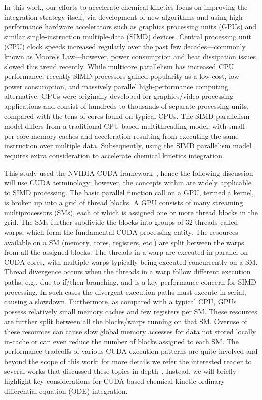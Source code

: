 \documentclass[preprint,review,11pt]{elsarticle}
\begin{document}
In this work, our efforts to accelerate chemical kinetics focus on improving the integration strategy itself, via development of new algorithms and using high-performance hardware accelerators such as graphics processing units (GPUs) and similar single-instruction multiple-data (SIMD) devices.
Central processing unit (CPU) clock speeds increased regularly over the past few decades---commonly known as Moore's Law---however, power consumption and heat dissipation issues slowed this trend recently.
While multicore parallelism has increased CPU performance, recently SIMD processors gained popularity as a low cost, low power consumption, and massively parallel high-performance computing alternative.
GPUs were originally developed for graphics\slash video processing applications and consist of hundreds to thousands of separate processing units, compared with the tens of cores found on typical CPUs.
The SIMD parallelism model differs from a traditional CPU-based multithreading model, with small per-core memory caches and acceleration resulting from executing the same instruction over multiple data.
Subsequently, using the SIMD parallelism model requires extra consideration to accelerate chemical kinetics integration.

This study used the NVIDIA CUDA framework~\cite{Buck:2008aa,NVIDIA:2015aa}, hence the following discussion will use CUDA terminology; however, the concepts within are widely applicable to SIMD processing.
The basic parallel function call on a GPU, termed a kernel, is broken up into a grid of thread blocks.
A GPU consists of many streaming multiprocessors (SMs), each of which is assigned one or more thread blocks in the grid.
The SMs further subdivide the blocks into groups of \num{32} threads called warps, which form the fundamental CUDA processing entity.
The resources available on a SM (memory, cores, registers, etc.) are split between the warps from all the assigned blocks.
The threads in a warp are executed in parallel on CUDA cores, with multiple warps typically being executed concurrently on a SM.
Thread divergence occurs when the threads in a warp follow different execution paths, e.g., due to if\slash then branching, and is a key performance concern for SIMD processing.
In such cases the divergent execution paths must execute in serial, causing a slowdown.
Furthermore, as compared with a typical CPU, GPUs possess relatively small memory caches and few registers per SM.
These resources are further split between all the blocks\slash warps running on that SM.
Overuse of these resources can cause slow global memory accesses for data not stored locally in-cache or can even reduce the number of blocks assigned to each SM.
The performance tradeoffs of various CUDA execution patterns are quite involved and beyond the scope of this work; for more details we refer the interested reader to several works that discussed these topics in depth~\cite{Cruz:2011gc,Brodtkorb:2013hn,Niemeyer:2014hn}.
Instead, we will briefly highlight key considerations for CUDA-based chemical kinetic ordinary differential equation (ODE) integration.
\end{document}
